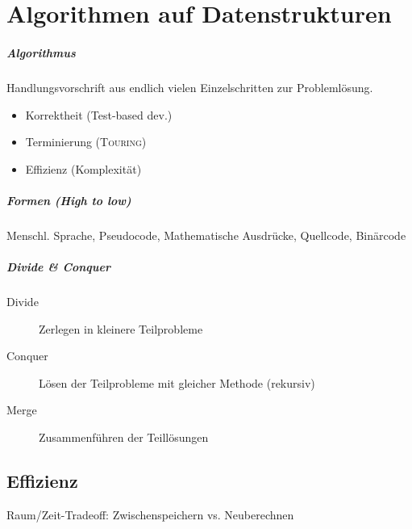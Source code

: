 \chapter{Algorithmen auf Datenstrukturen}

\paragraph{Algorithmus} Handlungsvorschrift aus endlich vielen Einzelschritten zur Problemlösung.

\begin{itemize}
  \item Korrektheit (Test-based dev.)
  \item Terminierung (\textsc{Touring})
  \item Effizienz (Komplexität)
\end{itemize}

\paragraph{Formen (High to low)}
Menschl. Sprache, Pseudocode, Mathematische Ausdrücke, Quellcode, Binärcode

\paragraph{Divide \& Conquer}

\begin{description}
  \item [Divide] Zerlegen in kleinere Teilprobleme

  \item [Conquer] Lösen der Teilprobleme mit gleicher Methode (rekursiv)

  \item [Merge] Zusammenführen der Teillösungen
\end{description}

\section{Effizienz}

Raum/Zeit-Tradeoff: Zwischenspeichern vs. Neuberechnen


